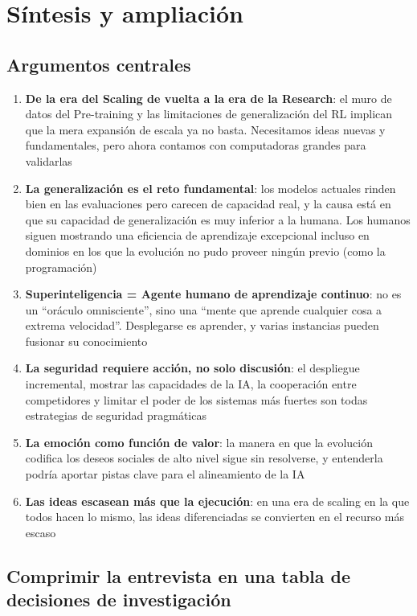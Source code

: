 \section{Síntesis y ampliación}

\subsection{Argumentos centrales}

\begin{enumerate}
    \item \textbf{De la era del Scaling de vuelta a la era de la Research}: el muro de datos del Pre-training y las limitaciones de generalización del RL implican que la mera expansión de escala ya no basta. Necesitamos ideas nuevas y fundamentales, pero ahora contamos con computadoras grandes para validarlas
    \item \textbf{La generalización es el reto fundamental}: los modelos actuales rinden bien en las evaluaciones pero carecen de capacidad real, y la causa está en que su capacidad de generalización es muy inferior a la humana. Los humanos siguen mostrando una eficiencia de aprendizaje excepcional incluso en dominios en los que la evolución no pudo proveer ningún previo (como la programación)
    \item \textbf{Superinteligencia = Agente humano de aprendizaje continuo}: no es un ``oráculo omnisciente'', sino una ``mente que aprende cualquier cosa a extrema velocidad''. Desplegarse es aprender, y varias instancias pueden fusionar su conocimiento
    \item \textbf{La seguridad requiere acción, no solo discusión}: el despliegue incremental, mostrar las capacidades de la IA, la cooperación entre competidores y limitar el poder de los sistemas más fuertes son todas estrategias de seguridad pragmáticas
    \item \textbf{La emoción como función de valor}: la manera en que la evolución codifica los deseos sociales de alto nivel sigue sin resolverse, y entenderla podría aportar pistas clave para el alineamiento de la IA
    \item \textbf{Las ideas escasean más que la ejecución}: en una era de scaling en la que todos hacen lo mismo, las ideas diferenciadas se convierten en el recurso más escaso
\end{enumerate}

\subsection{Comprimir la entrevista en una tabla de decisiones de investigación}


